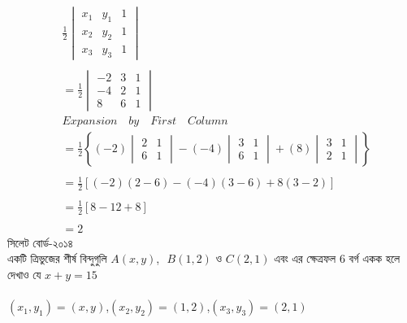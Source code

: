 \documentclass{article}
\begin{document}
\begin{align*}
&\frac{1}{2}\begin{vmatrix}
	x_1 &	y_1 & 1\\
	x_2 & y_2 & 1\\
	x_3 & y_3 & 1
\end{vmatrix}\\
\\
&=\frac{1}{2}\begin{vmatrix}
	-2 & 3 & 1\\
	-4 & 2 & 1\\
	8 & 6 & 1
\end{vmatrix}\\
&\boxed{Expansion \quad by \quad  First \quad  Column}\\ 
&=\frac{1}{2}\left\{(-2)\begin{vmatrix}
	2 & 1\\
	6 & 1
\end{vmatrix}-(-4)\begin{vmatrix}
	3 & 1\\
	6 & 1
\end{vmatrix}+(8)\begin{vmatrix}
	3 & 1\\
	2 & 1
\end{vmatrix}\right\}\\
\\
&=\frac{1}{2}\left[(-2)(2-6)-(-4)(3-6)+8(3-2)\right]\\
\\
&=\frac{1}{2}\left[8-12+8\right]\\
\\
&=2
\end{align*}
সিলেট বোর্ড-২০১৪\\
একটি ত্রিভুজের শীর্ষ বিন্দুগুলি $A(x,y)$,\,\, $B(1,2)$ ও $C(2,1)$ এবং এর ক্ষেত্রফল $6$ বর্গ একক হলে দেখাও যে $x+y=15$\\
\\
$(x_1,y_1)=(x,y)$,\quad $(x_2,y_2)=(1,2)$,\quad $(x_3,y_3)=(2,1)$\\
\\ 
\end{document}
